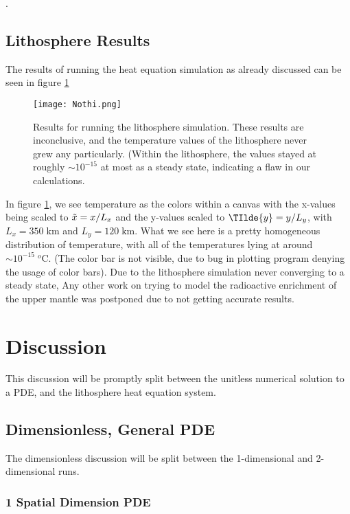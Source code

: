 \documentclass[reprint,english,notitlepage]{revtex4-1}  %
\begin{document}
\newpage
.
\newpage
\subsection{Lithosphere Results}

The results of running the heat equation simulation as already discussed can be seen in figure \ref{fig:failedlitho}

\begin{figure}[h!]
    \centering
    \texttt{[image: Nothi.png]}
    \caption{Results for running the lithosphere simulation. These results are inconclusive, and the temperature values of the lithosphere never grew any particularly. (Within the lithosphere, the values stayed at roughly $\sim 10^{-15}$ at most as a steady state, indicating a flaw in our calculations.}
    \label{fig:failedlitho}
\end{figure}


In figure \ref{fig:failedlitho}, we see temperature as the colors within a canvas with the x-values being scaled to $\Tilde{x} = x/L_{x}$ and the y-values scaled to $\TIlde{y} = y/L_{y}$, with $L_{x} = 350\;\text{km}$ and $L_{y} = 120\;\text{km}$. What we see here is a pretty homogeneous distribution of temperature, with all of the temperatures lying at around $\sim 10^{-15}\;^o\text{C}$. (The color bar is not visible, due to bug in plotting program denying the usage of color bars). Due to the lithosphere simulation never converging to a steady state, Any other work on trying to model the radioactive enrichment of the upper mantle was postponed due to not getting accurate results.

\newpage

\section{Discussion}

This discussion will be promptly split between the unitless numerical solution to a PDE, and the lithosphere heat equation system.

\subsection{Dimensionless, General PDE}

The dimensionless discussion will be split between the 1-dimensional and 2-dimensional runs.

\subsubsection{1 Spatial Dimension PDE}
\end{document}
